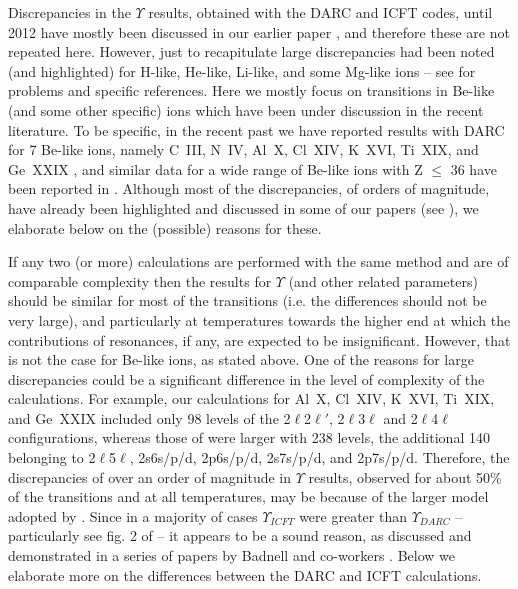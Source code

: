 \documentclass[fleqn]{article}
\begin{document}
Discrepancies in the $\Upsilon$ results, obtained with the DARC and ICFT codes, until 2012 have mostly been discussed in our earlier paper \cite{fst}, and therefore these are not repeated here. However, just to recapitulate large discrepancies had been noted (and highlighted) for H-like, He-like, Li-like, and some Mg-like ions -- see \cite{fst} for problems and specific references. Here we mostly focus on transitions in Be-like (and some other specific) ions which have been under discussion in the recent literature. To be specific, in the recent past we have reported results with DARC for 7 Be-like ions, namely  C~III, N~IV, Al~X, Cl~XIV, K~XVI, Ti~XIX, and Ge~XXIX \cite{ti19, ciii, niv, belike, alx1},    and similar data for a wide range of Be-like ions with Z $\le$ 36 have been reported in \cite{nrbelike}. Although most of the discrepancies, of orders of magnitude, have already been highlighted and discussed in some of our papers (see \cite{ciii, niv, alx2}), we elaborate below on the (possible) reasons for these.

If any two (or more)  calculations are performed with the same method and are of comparable complexity then the results for $\Upsilon$ (and other related parameters) should be similar for most of the transitions (i.e. the differences should not be very large), and particularly at temperatures towards the higher end at which the contributions of resonances, if any, are expected to be insignificant. However, that is not the case for Be-like ions, as stated above. One of the reasons for large discrepancies could be a significant difference in  the level of complexity of the calculations. For example, our calculations for Al~X, Cl~XIV, K~XVI, Ti~XIX, and Ge~XXIX \cite{ti19,  belike, alx1} included only 98 levels of the 2$\ell$2$\ell'$, 2$\ell$3$\ell$ and  2$\ell$4$\ell$  configurations, whereas those of \cite{nrbelike} were larger with 238 levels, the additional 140 belonging to  2$\ell$5$\ell$, 2s6s/p/d, 2p6s/p/d, 2s7s/p/d, and 2p7s/p/d. Therefore, the discrepancies of over an order of magnitude in $\Upsilon$ results,  observed for about 50\% of the transitions and at all temperatures, may be because of the larger model adopted by \cite{nrbelike}. Since in a majority of cases $\Upsilon_{ICFT}$ were greater than $\Upsilon_{DARC}$  -- particularly see fig. 2 of \cite{alx2} -- it appears to be a sound reason, as discussed and demonstrated  in a series of papers by Badnell and co-workers \cite{icft2, icft3, icft4}. Below we elaborate more on the differences between the DARC and ICFT calculations.
\end{document}
